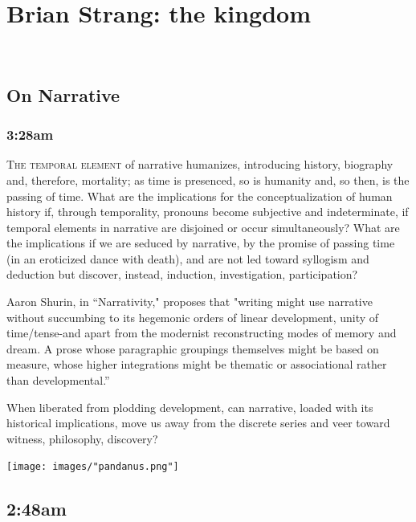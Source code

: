 \documentclass[
]{memoir}
\begin{document}
~

\hypertarget{brian-strang-the-kingdom}{%
\chapter{Brian Strang: the kingdom}\label{brian-strang-the-kingdom}}

~

\hypertarget{on-narrative}{%
\section*{On Narrative}\label{on-narrative}}

\hypertarget{am}{%
\subsection*{3:28am}\label{am}}

\lettrine[lines=3, findent=0em, nindent=0.1em, lhang=0]{T}{he temporal element}
of narrative humanizes, introducing history, biography and, therefore,
mortality; as time is presenced, so is humanity and, so then, is the
passing of time. What are the implications for the conceptualization of
human history if, through temporality, pronouns become subjective and
indeterminate, if temporal elements in narrative are disjoined or occur
simultaneously? What are the implications if we are seduced by
narrative, by the promise of passing time (in an eroticized dance with
death), and are not led toward syllogism and deduction but discover,
instead, induction, investigation, participation?

Aaron Shurin, in ``Narrativity," proposes that "writing might use
narrative without succumbing to its hegemonic orders of linear
development, unity of time/tense-and apart from the modernist
reconstructing modes of memory and dream. A prose whose paragraphic
groupings themselves might be based on measure, whose higher
integrations might be thematic or associational rather than
developmental.''

When liberated from plodding development, can narrative, loaded with its
historical implications, move us away from the discrete series and veer
toward witness, philosophy, discovery?

\begin{center}\texttt{[image: images/"pandanus.png"]}\end{center}

\hypertarget{am-1}{%
\section*{2:48am}\label{am-1}}
\end{document}
